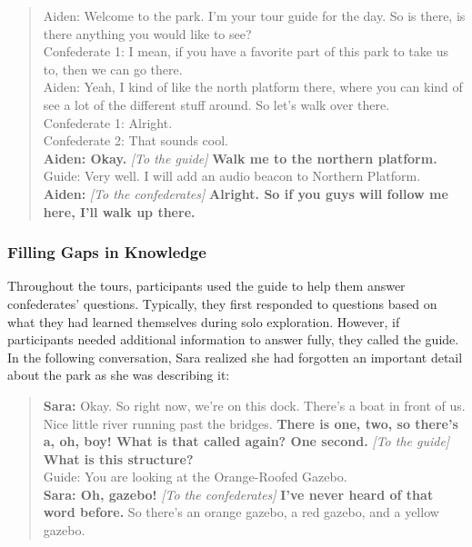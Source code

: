 \begin{quote}
Aiden: Welcome to the park. I'm your tour guide for the day. So is there, is there anything you would like to see?\\
Confederate 1: I mean, if you have a favorite part of this park to take us to, then we can go there.\\
Aiden: Yeah, I kind of like the north platform there, where you can kind of see a lot of the different stuff around. So let's walk over there.\\
Confederate 1: Alright.\\
Confederate 2: That sounds cool.\\
\textbf{Aiden: Okay.} \textit{[To the guide]} \textbf{Walk me to the northern platform.}\\
Guide:  Very well. I will add an audio beacon to Northern Platform.\\
\textbf{Aiden:}  \textit{[To the confederates]} \textbf{Alright. So if you guys will follow me here, I'll walk up there.}
\end{quote}

\subsubsection{Filling Gaps in Knowledge} \label{sec: Filling Gaps in Knowledge}

Throughout the tours, participants used the guide to help them answer confederates’ questions. Typically, they first responded to questions based on what they had learned themselves during solo exploration. However, if participants needed additional information to answer fully, they called the guide. In the following conversation, Sara realized she had forgotten an important detail about the park as she was describing it:

\begin{quote}
\textbf{Sara:} Okay. So right now, we're on this dock. There's a boat in front of us. Nice little river running past the bridges. \textbf{There is one, two, so there's a, oh, boy! What is that called again? One second.} \textit{[To the guide]} \textbf{What is this structure?}\\
Guide: You are looking at the Orange-Roofed Gazebo.\\
\textbf{Sara: Oh, gazebo!} \textit{[To the confederates]} \textbf{I've never heard of that word before.} So there's an orange gazebo, a red gazebo, and a yellow gazebo.
\end{quote}

